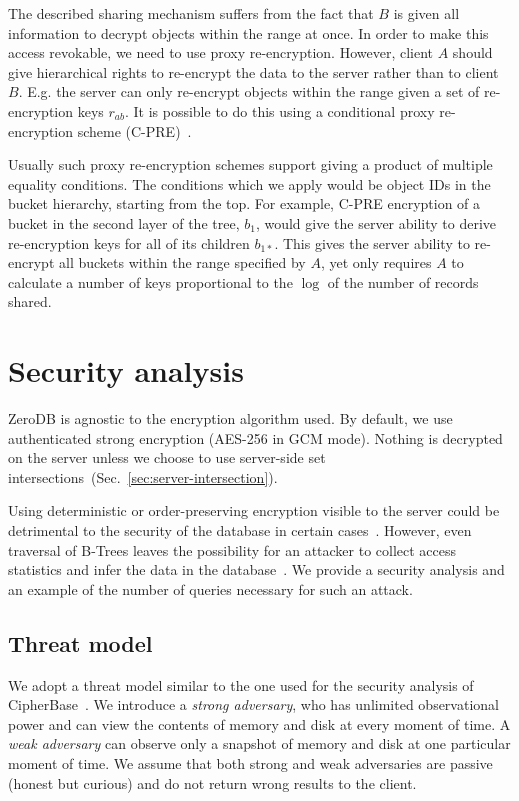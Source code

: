 \documentclass[notitlepage]{revtex4-1}
\begin{document}
The described sharing mechanism suffers from the fact that $B$ is given all information to decrypt objects within the range at once.
In order to make this access revokable, we need to use proxy re-encryption.
However, client $A$ should give hierarchical rights to re-encrypt the data to the server rather than to client $B$.
E.g. the server can only re-encrypt objects within the range given a set of re-encryption keys $r_{ab}$.
It is possible to do this using a conditional proxy re-encryption scheme (C-PRE)~\cite{conditional-pre-2009,unidirectional-pre-2010,conditional-pre-2014,hierarchical-pre}.

Usually such proxy re-encryption schemes support giving a product of multiple equality conditions.
The conditions which we apply would be object IDs in the bucket hierarchy, starting from the top.
For example, C-PRE encryption of a bucket in the second layer of the tree, $b_1$, would give the server ability to derive re-encryption keys for all of its children $b_{1*}$.
This gives the server ability to re-encrypt all buckets within the range specified by $A$, yet only requires $A$ to calculate a number of keys proportional to the $\log$ of the number of records shared.

\section{Security analysis}

ZeroDB is agnostic to the encryption algorithm used.
By default, we use authenticated strong encryption ({AES-256} in GCM mode).
Nothing is decrypted on the server unless we choose to use server-side set intersections~(Sec.~\ref{sec:server-intersection}).

Using deterministic or order-preserving encryption visible to the server could be detrimental to the security of the database in certain cases~\cite{cryptdb-hacked}.
However, even traversal of B-Trees leaves the possibility for an attacker to collect access statistics and infer the data in the database~\cite{access-pattern-attack}.
We provide a security analysis and an example of the number of queries necessary for such an attack.

\subsection{Threat model}

We adopt a threat model similar to the one used for the security analysis of CipherBase~\cite{cipherbase}.
We introduce a \emph{strong adversary}, who has unlimited observational power and can view the contents of memory and disk at every moment of time.
A \emph{weak adversary} can observe only a snapshot of memory and disk at one particular moment of time.
We assume that both strong and weak adversaries are passive (honest but curious) and do not return wrong results to the client.
\end{document}
